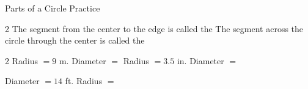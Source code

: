 
\newpage
\begin{stepPractice}{Parts of a Circle Practice}
    \resetProblems

    \begin{multicols}{2}
    \prob The segment from the center to the edge is called the \answerBlank[2.5cm]
    \prob The segment across the circle through the center is called the \answerBlank[2.5cm]
    \end{multicols}

    \begin{multicols}{2}
    \prob Radius $= 9$ m. Diameter $=$ \answerBlank[2cm]
    \prob Radius $= 3.5$ in. Diameter $=$ \answerBlank[2cm]
    \end{multicols}

    \prob Diameter $= 14$ ft. Radius $=$ \answerBlank[2cm]

\end{stepPractice}
